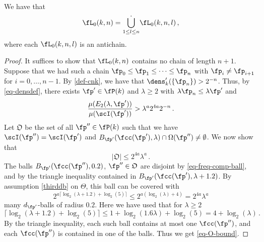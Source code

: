 \begin{lemma}[L0 antichain]
\label{L0-antichain}
\leanok
{}
    We have that
    $$
        \fL_0(k,n) = \dot{\bigcup_{1 \le l \le n}} \fL_0(k,n,l)\,,
    $$
    where each $\fL_0(k,n,l)$ is an antichain.
\end{lemma}

\begin{proof}
    \leanok
    It suffices to show that $\fL_0(k,n)$ contains no chain of length $n + 1$. Suppose that we had such a chain $\fp_0 \le \fp_1 \le \dotsb \le \fp_{n}$ with $\fp_i \ne \fp_{i+1}$ for $i =0, \dotsc, n-1$. By \eqref{def-cnk}, we have that $\dens_k'(\{\fp_n\}) > 2^{-n}$. Thus, by \eqref{eq-densdef}, there exists $\fp' \in \fP(k)$ and $\lambda \ge 2$ with $\lambda \fp_n \le \lambda \fp'$ and
    \begin{equation}
        \label{eq-p'}
        \frac{\mu(E_2(\lambda, \fp'))}{\mu(\scI(\fp'))} > \lambda^{a} 2^{4a} 2^{-n}\,.
    \end{equation}
    Let $\mathfrak{O}$ be the set of all $\fp'' \in \fP(k)$ such that we have $ \scI(\fp'') = \scI(\fp')$ and $B_{\fp'}(\fcc(\fp'), \lambda) \cap \Omega(\fp'') \neq \emptyset$.
    We now show that
    \begin{equation}
        \label{eq-O-bound}
        |\mathfrak{O}| \le 2^{4a}\lambda^a\,.
    \end{equation}
    The balls $B_{\fp'}(\fcc(\fp''), 0.2)$, $\fp'' \in \mathfrak{O}$ are disjoint by \eqref{eq-freq-comp-ball},
    and by the triangle inequality contained in $B_{\fp'}(\fcc(\fp'), \lambda+1.2)$.
    By assumption \eqref{thirddb} on $\Theta$, this ball can be covered with
    $$
        2^{a\lceil \log_2(\lambda+1.2) + \log_2(5)\rceil} \le 2^{a(\log_2(\lambda) + 4)} = 2^{4a}\lambda^a
    $$
    many $d_{\fp'}$-balls of radius $0.2$. Here we have used that for $\lambda \ge 2$
    $$
        \lceil \log_2(\lambda + 1.2)  + \log_2(5) \rceil \le 1+ \log_2(1.6  \lambda) + \log_2(5) = 4 + \log_2(\lambda)\,.
    $$
    By the triangle inequality, each such ball contains at most one $\fcc(\fp'')$, and each $\fcc(\fp'')$ is contained in one of the balls. Thus we get \eqref{eq-O-bound}.


\end{proof}
